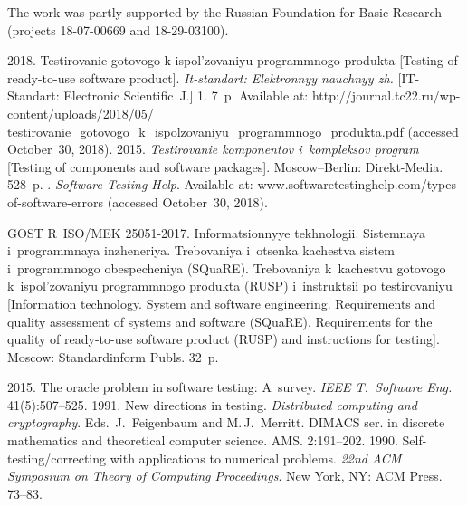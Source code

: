 
\Ack
\noindent
The work was partly supported by
the Russian Foundation for Basic Research (projects 18-07-00669 and 18-29-03100).




  \begin{multicols}{2}

\renewcommand{\bibname}{\protect\rmfamily References}

{\small\frenchspacing
 {%
 \begin{thebibliography}{99}
 


 2018. 
Testirovanie gotovogo k ispol'zovaniyu programmnogo produkta [Testing of 
ready-to-use software product]. \textit{It-standart: Elektronnyy nauchnyy zh.} 
 [IT-Standart: Electronic Scientific~J.]  1. 7~p. Available at: {\sf  
http://journal.tc22.ru/wp-content/uploads/2018/05/\linebreak 
testirovanie\_gotovogo\_k\_ispolzovaniyu\_programmnogo\_\linebreak produkta.pdf} (accessed 
October~30, 2018).
 2015. \textit{Testirovanie komponentov i~kompleksov program} 
[Testing of components and software packages].  Moscow--Berlin: Direkt-Media. 
528~p.
. \textit{Software 
Testing Help}. Available at: {\sf  
www.\linebreak softwaretestinghelp.com/types-of-software-errors} (accessed October~30, 
2018).

GOST R~ISO/MEK 25051-2017. Informatsionnyye tekhnologii. Sistemnaya 
i~programmnaya inzheneriya. Trebovaniya i~otsenka kachestva sistem 
i~programmnogo obespecheniya (SQuaRE). Trebovaniya k~kachestvu gotovogo 
k~ispol'zovaniyu programmnogo produkta (RUSP) i~instruktsii po testirovaniyu 
[Information technology. System and software engineering. Requirements and 
quality assessment of systems and software (SQuaRE). Requirements for the 
quality of ready-to-use software product (RUSP) and instructions for testing]. 
Moscow: Standardinform Publs. 32~p.

 2015. 
The oracle problem in software testing: A~survey. \textit{IEEE T.~Software Eng.} 
41(5):507--525. 
 1991. New directions in testing.  \textit{Distributed 
computing and cryptography}. Eds.\ J.~Feigenbaum and M.\,J.~Merritt.
DIMACS ser. in 
discrete mathematics and theoretical computer science.  AMS. 2:191--202.
 1990. Self-testing/correcting with 
applications to numerical problems. \textit{22nd ACM Symposium on Theory of 
Computing Proceedings}. New York, NY: ACM Press. 73--83.


\end{thebibliography}}}
\end{multicols}
